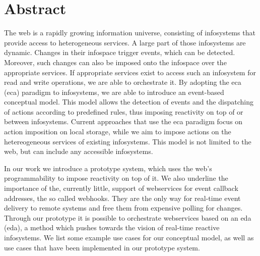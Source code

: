 \chapter*{Abstract}
The \textrm{\gls{web}} is a rapidly growing information universe, consisting of \textrm{\glspl{infosystem}} that provide access to heterogeneous services.
A large part of those \textrm{\glspl{infosystem}} are dynamic.
Changes in their \textrm{\gls{infospace}} trigger events, which can be detected.
Moreover, such changes can also be imposed onto the \textrm{\gls{infospace}} over the appropriate services.
If appropriate services exist to access such an \textrm{\gls{infosystem}} for read and write operations, we are able to orchestrate it.
By adopting the \textrm{\acrlong{eca} (\acrshort{eca})} paradigm to \textrm{\glspl{infosystem}}, we are able to introduce an event-based conceptual model.
This model allows the detection of events and the dispatching of actions according to predefined rules, thus imposing reactivity on top of or between \textrm{\glspl{infosystem}}.
Current approaches that use the \textrm{\acrshort{eca}} paradigm focus on action imposition on local storage, while we aim to impose actions on the hetereogeneous services of existing \textrm{\glspl{infosystem}}.
This model is not limited to the \textrm{\gls{web}}, but can include any accessible \textrm{\glspl{infosystem}}.

In our work we introduce a prototype system, which uses the \textrm{\gls{web}}'s programmability to impose reactivity on top of it.
We also underline the importance of the, currently little, support of \textrm{\glspl{webservice}} for event callback addresses, the so called \textrm{\glspl{webhook}}.
They are the only way for real-time event delivery to remote systems and free them from expensive polling for changes.
Through our prototype it is possible to orchestrate \textrm{\glspl{webservice}} based on an \textrm{\acrlong{eda} (\acrshort{eda})}, a method which pushes towards the vision of real-time reactive \textrm{\glspl{infosystem}}.
We list some example use cases for our conceptual model, as well as use cases that have been implemented in our prototype system.
